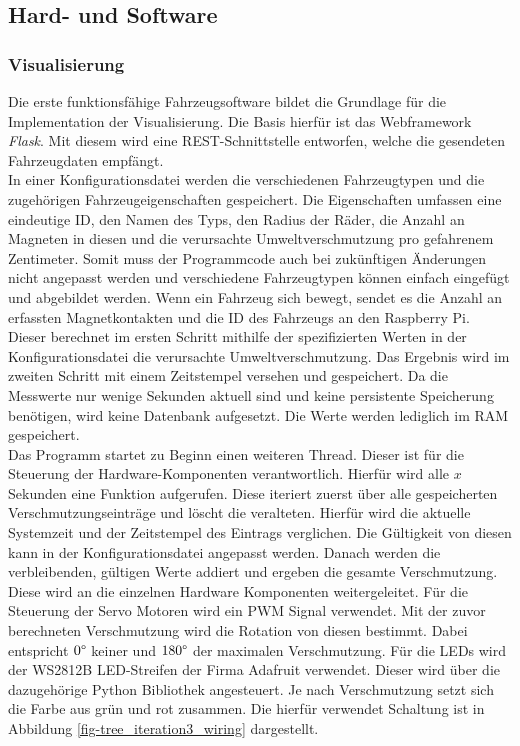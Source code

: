 \documentclass[.../Dokumentation.tex]{subfiles}
\begin{document}
    \subsection{Hard- und Software}
    \label{sec-ita3-hardware}
    \subsubsection*{Visualisierung}
    Die erste funktionsfähige Fahrzeugsoftware bildet die Grundlage für die Implementation der Visualisierung. Die Basis hierfür ist das Webframework \emph{Flask}. Mit diesem wird eine REST-Schnittstelle entworfen, welche die gesendeten Fahrzeugdaten empfängt. \\
    In einer Konfigurationsdatei werden die verschiedenen Fahrzeugtypen und die zugehöri\-gen Fahrzeugeigenschaften gespeichert. Die Eigenschaften umfassen eine eindeutige ID, den Namen des Typs, den Radius der Räder, die Anzahl an Magneten in diesen und die verursachte Umweltverschmutzung pro gefahrenem Zentimeter. Somit muss der Programmcode auch bei zukünftigen Änderungen nicht angepasst werden und verschiedene Fahrzeugtypen können einfach eingefügt und abgebildet werden. Wenn ein Fahrzeug sich bewegt, sendet es die Anzahl an erfassten Magnetkontakten und die ID des Fahrzeugs an den Raspberry Pi. Dieser berechnet im ersten Schritt mithilfe der spezifizierten Werten in der Konfigurationsdatei die verursachte Umweltverschmutzung. Das Ergebnis wird im zweiten Schritt mit einem Zeitstempel versehen und gespeichert. Da die Messwerte nur wenige Sekunden aktuell sind und keine persistente Speicherung benötigen, wird keine Datenbank aufgesetzt. Die Werte werden lediglich im RAM gespeichert.\\
    Das Programm startet zu Beginn einen weiteren Thread. Dieser ist für die Steuerung der Hardware-Komponenten verantwortlich. Hierfür wird alle $x$ Sekunden eine Funktion aufgerufen. Diese iteriert zuerst über alle gespeicherten Verschmutzungseinträge und löscht die veralteten. Hierfür wird die aktuelle Systemzeit und der Zeitstempel des Eintrags verglichen. Die Gültigkeit von diesen kann in der Konfigurationsdatei angepasst werden. Danach werden die verbleibenden, gültigen Werte addiert und ergeben die gesamte Verschmutzung. Diese wird an die einzelnen Hardware Komponenten weitergeleitet. Für die Steuerung der Servo Motoren wird ein PWM Signal verwendet. Mit der zuvor berechneten Verschmutzung wird die Rotation von diesen bestimmt. Dabei entspricht $0 \degree$ keiner und $180 \degree$ der maximalen Verschmutzung. Für die LEDs wird der WS2812B LED-Streifen der Firma Adafruit verwendet. Dieser wird über die dazugehörige Python Bibliothek angesteuert. Je nach Verschmutzung setzt sich die Farbe aus grün und rot zusammen. Die hierfür verwendet Schaltung ist in Abbildung \ref{fig-tree_iteration3_wiring} dargestellt. 
\end{document}

